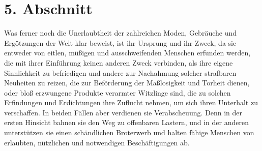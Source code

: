 \section{5. Abschnitt} \label{kap17_ab5}

Was ferner noch die Unerlaubtheit der zahlreichen Moden, Gebräuche und
Ergötzungen der Welt klar beweist, ist ihr Ursprung und ihr Zweck, da sie
entweder von eitlen, müßigen und ausschweifenden Menschen erfunden werden, die
mit ihrer Einführung keinen anderen Zweck verbinden, als ihre eigene
Sinnlichkeit
zu befriedigen und andere zur Nachahmung solcher strafbaren Neuheiten zu reizen,
die zur Beförderung der Maßlosigkeit und Torheit dienen,
oder bloß erzwungene
Produkte verarmter Witzlinge sind, die zu solchen Erfindungen und Erdichtungen
ihre Zuflucht nehmen, um sich ihren Unterhalt zu verschaffen. In beiden Fällen
aber verdienen sie Verabscheuung. Denn in der ersten Hinsicht bahnen sie den Weg
zu offenbaren Lastern, und in der anderen unterstützen sie einen schändlichen
Broterwerb und halten fähige Menschen von erlaubten,
nützlichen und
notwendigen Beschäftigungen ab.

\medskip

